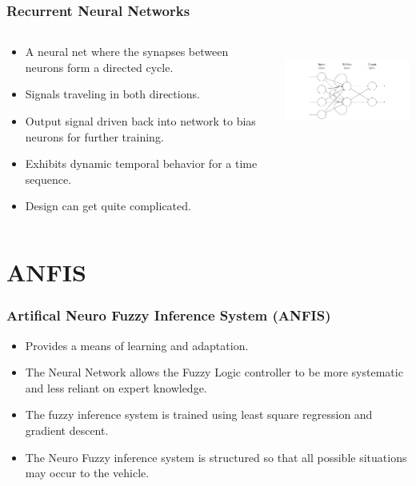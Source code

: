 \documentclass{beamer}
\begin{document}
   \begin{frame}
      \frametitle{Recurrent Neural Networks}
      \begin{columns}[T]
         \begin{column}[T]{5cm}
            \begin{itemize}
               \item A neural net where the synapses between neurons form a directed cycle.
               \item Signals traveling in both directions. 
               \item Output signal driven back into network to bias neurons for further training.
               \item Exhibits dynamic temporal behavior for a time sequence.
               \item Design can get quite complicated.
            \end{itemize}
         \end{column}
         \begin{column}[T]{5cm}
            \includegraphics[height=3cm]{recurrent}
         \end{column}
      \end{columns}
   \end{frame}

   \section{ANFIS}

   \begin{frame}
      \frametitle{Artifical Neuro Fuzzy Inference System (ANFIS)}
      \begin{itemize}
         \item Provides a means of learning and adaptation.
         \item The Neural Network allows the Fuzzy Logic controller to be more systematic and less reliant on expert knowledge.
         \item The fuzzy inference system is trained using least square regression and gradient descent.
         \item The Neuro Fuzzy inference system is structured so that all possible situations may occur to the vehicle.
      \end{itemize}
   \end{frame}
\end{document}
